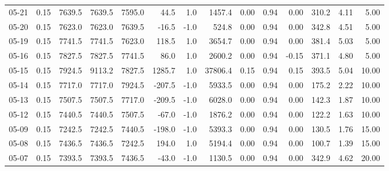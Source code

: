 \begin{threeparttable}
{\begin{tabular}{lrrrrrrrrrrrrr}
  05-21 &     0.15 & 7639.5 & 7639.5 & 7595.0 &       44.5 &                      1.0 &              1457.4 &       0.00 &      0.94 &           0.00 &            310.2 &            4.11 &                   5.00 \\
  05-20 &     0.15 & 7623.0 & 7623.0 & 7639.5 &      -16.5 &                     -1.0 &               524.8 &       0.00 &      0.94 &           0.00 &            342.8 &            4.51 &                   5.00 \\
  05-19 &     0.15 & 7741.5 & 7741.5 & 7623.0 &      118.5 &                      1.0 &              3654.7 &       0.00 &      0.94 &           0.00 &            381.4 &            5.03 &                   5.00 \\
  05-16 &     0.15 & 7827.5 & 7827.5 & 7741.5 &       86.0 &                      1.0 &              2600.2 &       0.00 &      0.94 &          -0.15 &            371.1 &            4.80 &                   5.00 \\
  05-15 &     0.15 & 7924.5 & 9113.2 & 7827.5 &     1285.7 &                      1.0 &             37806.4 &       0.15 &      0.94 &           0.15 &            393.5 &            5.04 &                  10.00 \\
  05-14 &     0.15 & 7717.0 & 7717.0 & 7924.5 &     -207.5 &                     -1.0 &              5933.5 &       0.00 &      0.94 &           0.00 &            175.2 &            2.22 &                  10.00 \\
  05-13 &     0.15 & 7507.5 & 7507.5 & 7717.0 &     -209.5 &                     -1.0 &              6028.0 &       0.00 &      0.94 &           0.00 &            142.3 &            1.87 &                  10.00 \\
  05-12 &     0.15 & 7440.5 & 7440.5 & 7507.5 &      -67.0 &                     -1.0 &              1876.2 &       0.00 &      0.94 &           0.00 &            122.2 &            1.63 &                  10.00 \\
  05-09 &     0.15 & 7242.5 & 7242.5 & 7440.5 &     -198.0 &                     -1.0 &              5393.3 &       0.00 &      0.94 &           0.00 &            130.5 &            1.76 &                  15.00 \\
  05-08 &     0.15 & 7436.5 & 7436.5 & 7242.5 &      194.0 &                      1.0 &              5194.4 &       0.00 &      0.94 &           0.00 &            100.7 &            1.39 &                  15.00 \\
  05-07 &     0.15 & 7393.5 & 7393.5 & 7436.5 &      -43.0 &                     -1.0 &              1130.5 &       0.00 &      0.94 &           0.00 &            342.9 &            4.62 &                  20.00 \\

\end{tabular}}
\end{threeparttable}
